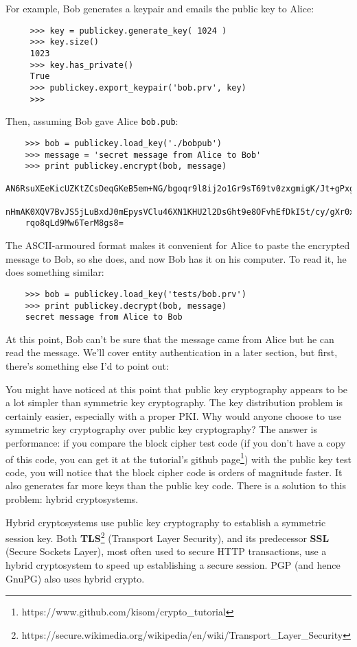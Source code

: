 \documentclass[letterpaper,10pt]{article}
\begin{document}
For example, Bob generates a keypair and emails the public key to Alice:
\begin{verbatim}
     >>> key = publickey.generate_key( 1024 )
     >>> key.size()
     1023
     >>> key.has_private()
     True
     >>> publickey.export_keypair('bob.prv', key)
     >>> 
\end{verbatim}

Then, assuming Bob gave Alice \verb|bob.pub|:
\begin{verbatim}
    >>> bob = publickey.load_key('./bobpub')
    >>> message = 'secret message from Alice to Bob'
    >>> print publickey.encrypt(bob, message)
    AN6RsuXEeKicUZKtZCsDeqGKeB5em+NG/bgoqr9l8ij2o1Gr9sT69tv0zxgmigK/Jt+gPxg/EDu61
    nHmAK0XQV7BvJS5jLuBxdJ0mEpysVClu46XN1KHU2l2DsGht9e8OFvhEfDkI5t/cy/gXr0xz/EUi
    rqo8qLd9Mw6TerM8gs8=
\end{verbatim}

The ASCII-armoured format makes it convenient for Alice to paste the encrypted
message to Bob, so she does, and now Bob has it on his computer. To read it, he
does something similar:
\begin{verbatim}
    >>> bob = publickey.load_key('tests/bob.prv')
    >>> print publickey.decrypt(bob, message)
    secret message from Alice to Bob
\end{verbatim}

At this point, Bob can't be sure that the message came from Alice but he can 
read the message. We'll cover entity authentication in a later section, but
first, there's something else I'd to point out:

You might have noticed at this point that public key cryptography appears to
be a lot simpler than symmetric key cryptography. The key distribution problem
is certainly easier, especially with a proper PKI. Why would anyone choose to
use symmetric key cryptography over public key cryptography? The answer is
performance: if you compare the block cipher test code (if you don't have a 
copy of this code, you can get it at the tutorial's 
github page\footnote{https://www.github.com/kisom/crypto\_tutorial}) with the public
key test code, you will notice that the block cipher code is orders of magnitude
faster. It also generates far more keys than the public key code. There is a 
solution to this problem: hybrid cryptosystems.

Hybrid cryptosystems use public key cryptography to establish a symmetric 
session key. Both \textbf{TLS}\footnote{https://secure.wikimedia.org/wikipedia/en/wiki/Transport\_Layer\_Security} 
(Transport Layer Security), and its predecessor \textbf{SSL} (Secure Sockets 
Layer), most often used to secure HTTP transactions, use a hybrid cryptosystem
to speed up establishing a secure session. PGP (and hence GnuPG) also uses
hybrid crypto.
\end{document}
